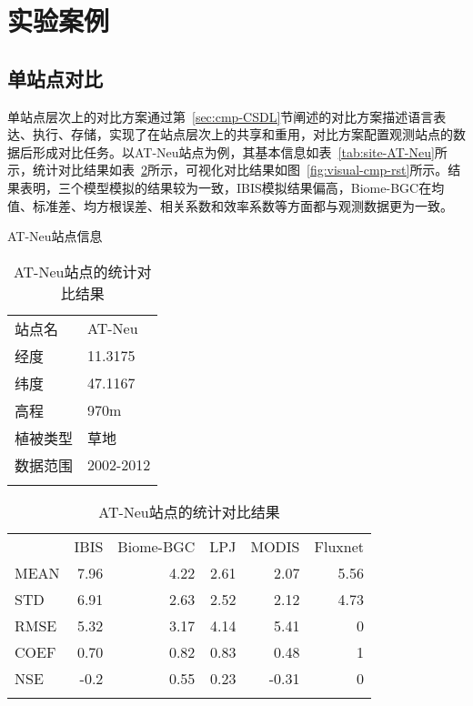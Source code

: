 \section{实验案例}
\label{sec:experiments}
\subsection{单站点对比}
单站点层次上的对比方案通过第~\ref{sec:cmp-CSDL}节阐述的对比方案描述语言表达、执行、存储，实现了在站点层次上的共享和重用，对比方案配置观测站点的数据后形成对比任务。以AT-Neu站点为例，其基本信息如表~\ref{tab:site-AT-Neu}所示，统计对比结果如表~\ref{tab:site-AT-Neu-stat}所示，可视化对比结果如图~\ref{fig:visual-cmp-rst}所示。结果表明，三个模型模拟的结果较为一致，IBIS模拟结果偏高，Biome-BGC在均值、标准差、均方根误差、相关系数和效率系数等方面都与观测数据更为一致。

\noindent\begin{table}[!htbp]
    \begin{minipage}[t]{.3\textwidth}
        \centering
        \caption{AT-Neu站点信息}
        \label{tab:site-AT-Neu}
        \begin{tabular}{ll}
            \Xhline{1.5pt}
            站点名 & AT-Neu \\
            经度 & 11.3175 \\
            纬度 & 47.1167 \\
            高程 & 970m \\
            植被类型 & 草地 \\
            数据范围 & 2002-2012 \\
            \Xhline{1.5pt}
        \end{tabular}
    \end{minipage} %
    \begin{minipage}[t]{.62\textwidth}
        \centering
        \caption{AT-Neu站点的统计对比结果}
        \label{tab:site-AT-Neu-stat}
        \begin{tabular}{lrrrrr}
            \Xhline{1.5pt}
            & IBIS & Biome-BGC & LPJ & MODIS & Fluxnet \\
            \Xhline{1.5pt}
            MEAN & 7.96 & 4.22 & 2.61 & 2.07 & 5.56 \\
            STD & 6.91 & 2.63 & 2.52 & 2.12 & 4.73 \\
            RMSE & 5.32 & 3.17 & 4.14 & 5.41 & 0 \\
            COEF & 0.70 & 0.82 & 0.83 & 0.48 & 1 \\
            NSE & -0.2 & 0.55 & 0.23 & -0.31 & 0 \\
            \Xhline{1.5pt}
        \end{tabular}
    \end{minipage}
\end{table}

